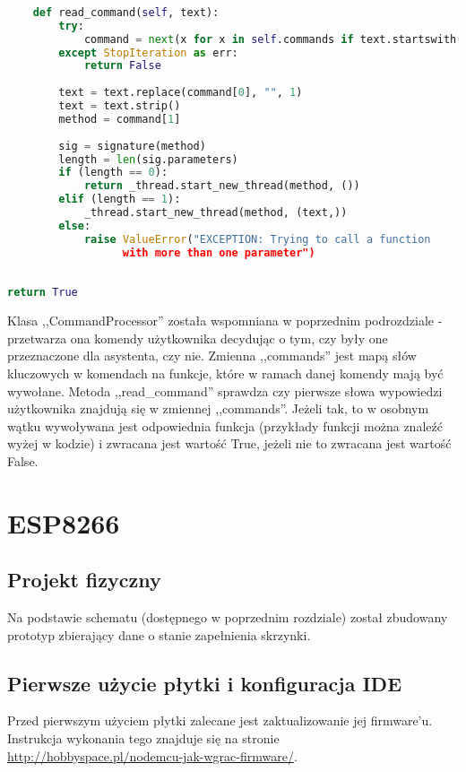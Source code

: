 \begin{lstlisting}[language=Python]
	
    def read_command(self, text):
        try:
            command = next(x for x in self.commands if text.startswith(x[0]))
        except StopIteration as err:
            return False
        
        text = text.replace(command[0], "", 1)
        text = text.strip()
        method = command[1]
           
        sig = signature(method)
        length = len(sig.parameters)
        if (length == 0):
            return _thread.start_new_thread(method, ())
        elif (length == 1):
            _thread.start_new_thread(method, (text,))
        else:
            raise ValueError("EXCEPTION: Trying to call a function
			      with more than one parameter") 
        
        
return True


\end{lstlisting} 

Klasa ,,CommandProcessor'' została wspomniana w poprzednim podrozdziale - przetwarza ona komendy użytkownika decydując o tym, czy były one przeznaczone dla 
asystenta, czy nie. Zmienna ,,commands'' jest mapą słów kluczowych w komendach
na funkcje, które w ramach danej komendy mają być wywołane. Metoda ,,read\_command'' sprawdza czy pierwsze słowa wypowiedzi użytkownika 
znajdują się w zmiennej ,,commands''. Jeżeli tak, to w osobnym wątku wywoływana jest odpowiednia funkcja (przykłady funkcji można znaleźć wyżej w kodzie)
i zwracana jest wartość True, jeżeli nie to zwracana jest wartość False.

\section{ESP8266}

\subsection{Projekt fizyczny}

Na podstawie schematu (dostępnego w poprzednim rozdziale) został zbudowany prototyp zbierający dane o stanie zapełnienia skrzynki.

\subsection{Pierwsze użycie płytki i konfiguracja IDE}

Przed pierwszym użyciem płytki zalecane jest zaktualizowanie jej firmware'u. Instrukcja wykonania tego znajduje się na stronie \url{http://hobbyspace.pl/nodemcu-jak-wgrac-firmware/}.

